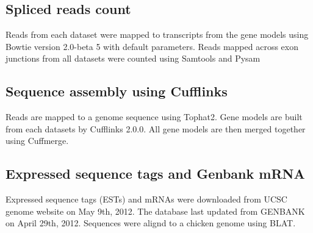 \documentclass[10pt]{article}
\begin{document}
\subsection*{Spliced reads count}

Reads from each dataset were mapped to transcripts from the gene models using Bowtie version 2.0-beta 5 with default parameters.
Reads mapped across exon junctions from all datasets were counted using Samtools\cite{Li:2009vz} and
Pysam\cite{pysam}

\subsection*{Sequence assembly using Cufflinks}
Reads are mapped to a genome sequence using Tophat2.
Gene models are built from each datasets by Cufflinks 2.0.0\cite{Trapnell:2010kd}.
All gene models are then merged together using Cuffmerge.

\subsection*{Expressed sequence tags and Genbank mRNA}
Expressed sequence tags (ESTs) and mRNAs were downloaded from UCSC genome website on May 9th, 2012.
The database last updated from GENBANK on April 29th, 2012.
Sequences were alignd to a chicken genome using BLAT.


\end{document}
